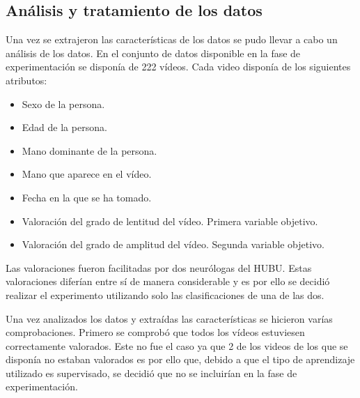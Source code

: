 \subsection{Análisis y tratamiento de los datos}
Una vez se extrajeron las características de los datos se pudo llevar a cabo un análisis de los datos.
En el conjunto de datos disponible en la fase de experimentación se disponía de 222 vídeos. 
Cada video disponía de los siguientes atributos:
\begin{itemize}
\item Sexo de la persona.
\item Edad de la persona.
\item Mano dominante de la persona.
\item Mano que aparece en el vídeo.
\item Fecha en la que se ha tomado.
\item Valoración del grado de lentitud del vídeo. Primera variable objetivo.
\item Valoración del grado de amplitud del vídeo. Segunda variable objetivo.
\end{itemize}
Las valoraciones fueron facilitadas por dos neurólogas del HUBU. Estas valoraciones diferían  entre sí de manera considerable y es por ello se decidió realizar el experimento utilizando solo las clasificaciones de una de las dos. 

Una vez analizados los datos y extraídas las características se hicieron varías comprobaciones. Primero se comprobó que todos los vídeos estuviesen correctamente valorados. Este no fue el caso ya que 2 de los videos de los que se disponía no estaban valorados es por ello que, debido a que el tipo de aprendizaje utilizado es supervisado, se decidió que no se incluirían en la fase de experimentación.

